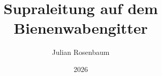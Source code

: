 \documentclass[
  tucolor,       %
  BCOR=12mm,     %
  parskip=half,  %
  open=any,      %
  cleardoublepage=plain,  %
]{tudothesis}
\author{Julian Rosenbaum}
\title{Supraleitung auf dem Bienenwabengitter}
\date{2026}
\begin{document}
\frontmatter

\maketitle

\makecorrectorpage


\tableofcontents

\mainmatter





\appendix


\backmatter
\printbibliography

\cleardoublepage

\end{document}
